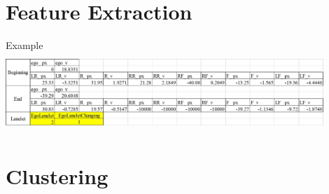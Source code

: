 \documentclass[shortpres]{beamer}
\begin{document}
\section{Feature Extraction}
\begin{frame}{Example}
    \includegraphics[width=12cm,height=3cm]{FeatureTable.jpg}
\end{frame}

\section{Clustering}	
\end{document}
